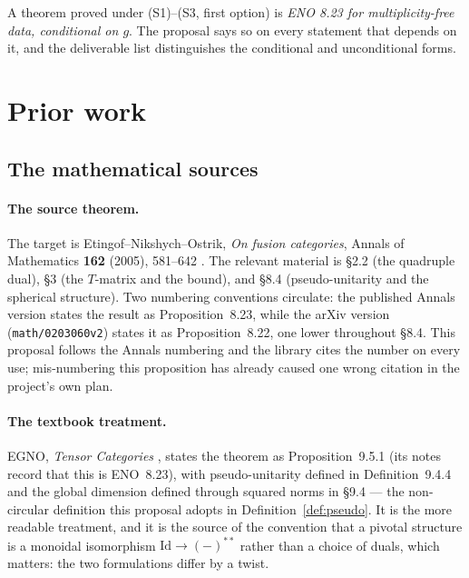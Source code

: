 \documentclass[11pt,a4paper]{article}
\theoremstyle{remark}
\newcommand{\Id}{\mathrm{Id}}
\begin{document}
A theorem proved under (S1)--(S3, first option) is \emph{ENO 8.23 for multiplicity-free data,
conditional on $g$}. The proposal says so on every statement that depends on it, and the
deliverable list distinguishes the conditional and unconditional forms.

\section{Prior work}\label{sec:prior}

\subsection{The mathematical sources}

\paragraph{The source theorem.}
The target is Etingof--Nikshych--Ostrik, \emph{On fusion categories}, Annals of Mathematics
\textbf{162} (2005), 581--642 \cite{ENO}. The relevant material is \S2.2 (the quadruple dual),
\S3 (the $T$-matrix and the bound), and \S8.4 (pseudo-unitarity and the spherical structure).
Two numbering conventions circulate: the published Annals version states the result as
Proposition~8.23, while the arXiv version (\texttt{math/0203060v2}) states it as
Proposition~8.22, one lower throughout \S8.4. This proposal follows the Annals numbering and
the library cites the number on every use; mis-numbering this proposition has already caused one
wrong citation in the project's own plan.

\paragraph{The textbook treatment.}
EGNO, \emph{Tensor Categories} \cite{EGNO}, states the theorem as Proposition~9.5.1 (its notes
record that this is ENO~8.23), with pseudo-unitarity defined in Definition~9.4.4 and the global
dimension defined through squared norms in \S9.4 --- the non-circular definition this proposal
adopts in Definition~\ref{def:pseudo}. It is the more readable treatment, and it is the source
of the convention that a pivotal structure is a monoidal isomorphism $\Id \to (-)^{**}$ rather
than a choice of duals, which matters: the two formulations differ by a twist.
\end{document}
